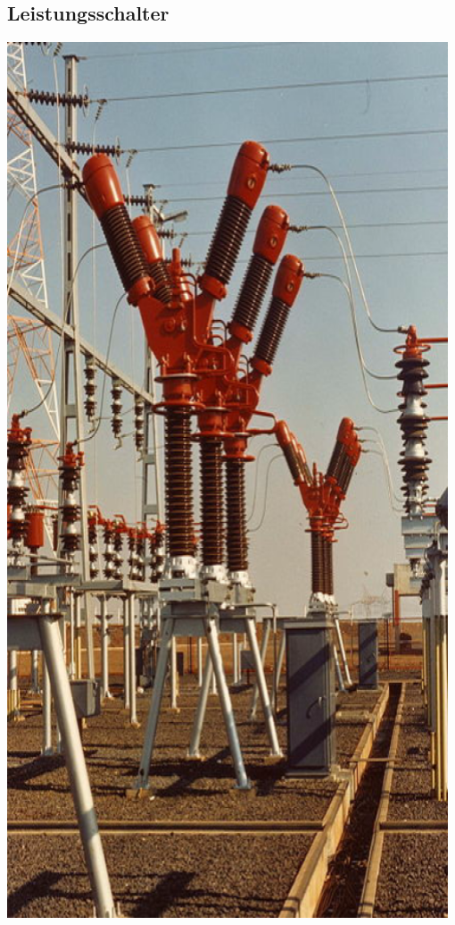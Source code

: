\subsection{Leistungsschalter}



\begin{minipage}[c]{0.28\columnwidth}
    \begin{center}
        \includegraphics[width=0.98\textwidth, align=c]{images/Leistungsschalter.png}
    \end{center}
    
\end{minipage}
